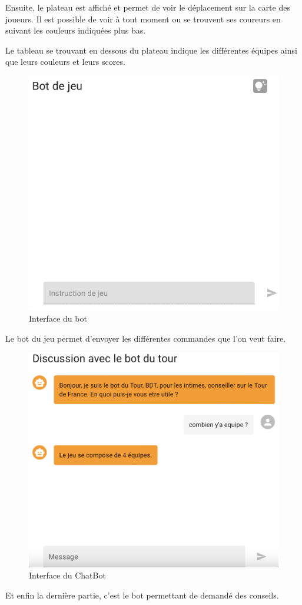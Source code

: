 \documentclass[a4paper, 11pt]{article}
\begin{document}
Ensuite, le plateau est affiché et permet de voir le déplacement sur la carte des joueurs. Il est possible de voir à tout moment ou se trouvent ses coureurs en suivant les couleurs indiquées plus bas.\newline

Le tableau se trouvant en dessous du plateau indique les différentes équipes ainsi que leurs couleurs et leurs scores.

\begin{figure}[!h]
	\centering
	\includegraphics[scale=.5]{assets/interface-2.png}
	\caption{Interface du bot}
\end{figure}

Le bot du jeu permet d'envoyer les différentes commandes que l'on veut faire.

\newpage

\begin{figure}[!h]
	\centering
	\includegraphics[scale=.5]{assets/interface-3.png}
	\caption{Interface du ChatBot}
\end{figure}

Et enfin la dernière partie, c'est le bot permettant de demandé des conseils.
\end{document}
